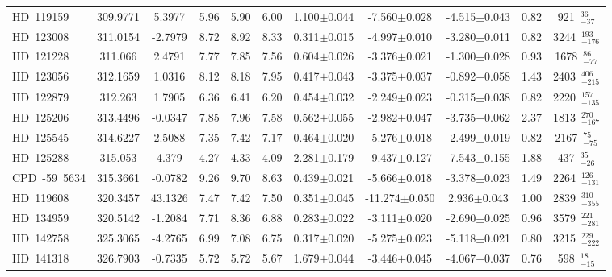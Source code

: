 {\begin{longtable}{lcccccccccc}
\noalign{\smallskip}
HD~119159 & 309.9771 & 5.3977 & 5.96 & 5.90 & 6.00 & 1.100$\pm$0.044 & -7.560$\pm$0.028 & -4.515$\pm$0.043 & 0.82 & 921~$_{-37}^{36}$ \\
\noalign{\smallskip}
HD~123008 & 311.0154 & -2.7979 & 8.72 & 8.92 & 8.33 & 0.311$\pm$0.015 & -4.997$\pm$0.010 & -3.280$\pm$0.011 & 0.82 & 3244~$_{-176}^{193}$ \\
\noalign{\smallskip}
HD~121228 & 311.066 & 2.4791 & 7.77 & 7.85 & 7.56 & 0.604$\pm$0.026 & -3.376$\pm$0.021 & -1.300$\pm$0.028 & 0.93 & 1678~$_{-77}^{86}$ \\
\noalign{\smallskip}
HD~123056 & 312.1659 & 1.0316 & 8.12 & 8.18 & 7.95 & 0.417$\pm$0.043 & -3.375$\pm$0.037 & -0.892$\pm$0.058 & 1.43 & 2403~$_{-215}^{406}$ \\
\noalign{\smallskip}
HD~122879 & 312.263 & 1.7905 & 6.36 & 6.41 & 6.20 & 0.454$\pm$0.032 & -2.249$\pm$0.023 & -0.315$\pm$0.038 & 0.82 & 2220~$_{-135}^{157}$ \\
\noalign{\smallskip}
HD~125206 & 313.4496 & -0.0347 & 7.85 & 7.96 & 7.58 & 0.562$\pm$0.055 & -2.982$\pm$0.047 & -3.735$\pm$0.062 & 2.37 & 1813~$_{-167}^{270}$ \\
\noalign{\smallskip}
HD~125545 & 314.6227 & 2.5088 & 7.35 & 7.42 & 7.17 & 0.464$\pm$0.020 & -5.276$\pm$0.018 & -2.499$\pm$0.019 & 0.82 & 2167~$_{-75}^{75}$ \\
\noalign{\smallskip}
HD~125288 & 315.053 & 4.379 & 4.27 & 4.33 & 4.09 & 2.281$\pm$0.179 & -9.437$\pm$0.127 & -7.543$\pm$0.155 & 1.88 & 437~$_{-26}^{35}$ \\
\noalign{\smallskip}
CPD~-59~5634 & 315.3661 & -0.0782 & 9.26 & 9.70 & 8.63 & 0.439$\pm$0.021 & -5.666$\pm$0.018 & -3.378$\pm$0.023 & 1.49 & 2264~$_{-131}^{126}$ \\
\noalign{\smallskip}
HD~119608 & 320.3457 & 43.1326 & 7.47 & 7.42 & 7.50 & 0.351$\pm$0.045 & -11.274$\pm$0.050 & 2.936$\pm$0.043 & 1.00 & 2839~$_{-355}^{310}$ \\
\noalign{\smallskip}
HD~134959 & 320.5142 & -1.2084 & 7.71 & 8.36 & 6.88 & 0.283$\pm$0.022 & -3.111$\pm$0.020 & -2.690$\pm$0.025 & 0.96 & 3579~$_{-281}^{221}$ \\
\noalign{\smallskip}
HD~142758 & 325.3065 & -4.2765 & 6.99 & 7.08 & 6.75 & 0.317$\pm$0.020 & -5.275$\pm$0.023 & -5.118$\pm$0.021 & 0.80 & 3215~$_{-222}^{229}$ \\
\noalign{\smallskip}
HD~141318 & 326.7903 & -0.7335 & 5.72 & 5.72 & 5.67 & 1.679$\pm$0.044 & -3.446$\pm$0.045 & -4.067$\pm$0.037 & 0.76 & 598~$_{-15}^{18}$ \\

\end{longtable}}

